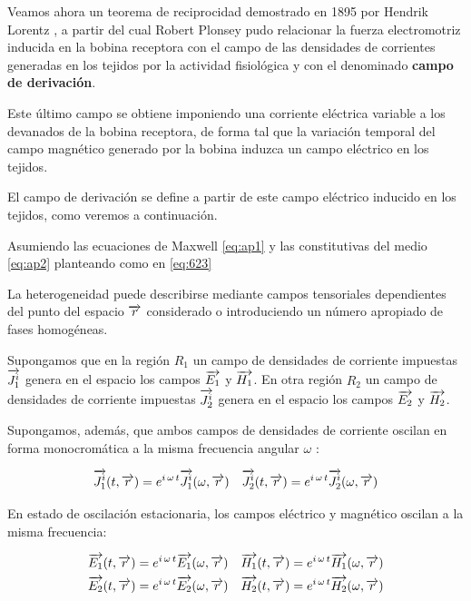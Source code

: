 
Veamos ahora un teorema de reciprocidad demostrado en 1895 por Hendrik Lorentz \citep{Papas_1988}, a partir del cual Robert Plonsey \citep{Plonsey_1992} pudo relacionar la fuerza electromotriz inducida en la bobina receptora con el campo de las densidades de corrientes generadas en los tejidos por la actividad fisiológica y con el denominado \textbf{campo de derivación}.

Este último campo se obtiene imponiendo una corriente eléctrica variable a los devanados de la bobina receptora, de forma tal que la variación temporal del campo magnético generado por la bobina induzca un campo eléctrico en los tejidos.

El campo de derivación se define a partir de este campo eléctrico inducido en los tejidos, como veremos a continuación.

Asumiendo las ecuaciones de Maxwell \ref{eq:ap1} y las constitutivas del medio \ref{eq:ap2} planteando como en \ref{eq:623} 

La heterogeneidad puede describirse mediante campos tensoriales dependientes del punto del espacio $\overrightarrow{r}$ considerado o introduciendo un número apropiado de fases homogéneas.

Supongamos que en la región $R_{1}$ un campo de densidades de corriente impuestas $\overrightarrow{J^{i}_{1}}$ genera en el espacio los campos $\overrightarrow{E_{1}}$ y $\overrightarrow{H_{1}}$.
En otra región $R_{2}$ un campo de densidades de corriente impuestas $\overrightarrow{J_{2}^{i}}$ genera en el espacio los campos $\overrightarrow{E_{2}}$ y $\overrightarrow{H_{2}}$.

Supongamos, además, que ambos campos de densidades de corriente oscilan en forma monocromática a la misma frecuencia angular $\omega$ :

\begin{equation}
	\overrightarrow{J_{1}^{i}}(t,\overrightarrow{r}) = e^{i\,\omega\,t}\overrightarrow{J_{1}^{i}}(\omega,\overrightarrow{r}) \quad
	\overrightarrow{J_{2}^{i}}(t,\overrightarrow{r}) = e^{i\,\omega\,t}\overrightarrow{J_{2}^{i}}(\omega,\overrightarrow{r}) 
\end{equation}

En estado de oscilación estacionaria, los campos eléctrico y magnético oscilan a la misma frecuencia:

\begin{equation}
\begin{aligned}
	&\overrightarrow{E_{1}}(t,\overrightarrow{r}) = e^{i\,\omega\,t}\overrightarrow{E_{1}}(\omega,\overrightarrow{r}) \quad
	 \overrightarrow{H_{1}}(t,\overrightarrow{r}) = e^{i\,\omega\,t}\overrightarrow{H_{1}}(\omega,\overrightarrow{r}) \\
	&\overrightarrow{E_{2}}(t,\overrightarrow{r}) = e^{i\,\omega\,t}\overrightarrow{E_{2}}(\omega,\overrightarrow{r}) \quad
	 \overrightarrow{H_{2}}(t,\overrightarrow{r}) = e^{i\,\omega\,t}\overrightarrow{H_{2}}(\omega,\overrightarrow{r}) 
\end{aligned}
\end{equation}

